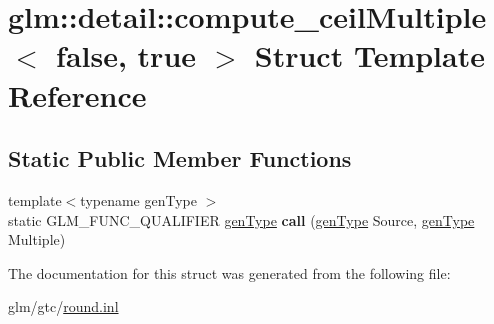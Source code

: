 \hypertarget{structglm_1_1detail_1_1compute__ceilMultiple_3_01false_00_01true_01_4}{\section{glm\-:\-:detail\-:\-:compute\-\_\-ceil\-Multiple$<$ false, true $>$ Struct Template Reference}
\label{structglm_1_1detail_1_1compute__ceilMultiple_3_01false_00_01true_01_4}
}
\subsection*{Static Public Member Functions}
\begin{DoxyCompactItemize}
\item 
\hypertarget{structglm_1_1detail_1_1compute__ceilMultiple_3_01false_00_01true_01_4_a065f8762eb2b48c4f746781fac7ab7f7}{{\footnotesize template$<$typename gen\-Type $>$ }\\static G\-L\-M\-\_\-\-F\-U\-N\-C\-\_\-\-Q\-U\-A\-L\-I\-F\-I\-E\-R \hyperlink{structglm_1_1detail_1_1genType}{gen\-Type} {\bfseries call} (\hyperlink{structglm_1_1detail_1_1genType}{gen\-Type} Source, \hyperlink{structglm_1_1detail_1_1genType}{gen\-Type} Multiple)}\label{structglm_1_1detail_1_1compute__ceilMultiple_3_01false_00_01true_01_4_a065f8762eb2b48c4f746781fac7ab7f7}

\end{DoxyCompactItemize}


The documentation for this struct was generated from the following file\-:\begin{DoxyCompactItemize}
\item 
glm/gtc/\hyperlink{round_8inl}{round.\-inl}\end{DoxyCompactItemize}
